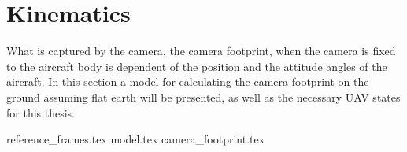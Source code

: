 \chapter{Kinematics}
\label{ch:kinematics}

What is captured by the camera, the camera footprint, when the camera is fixed to the aircraft body is dependent of the position and the attitude angles of the aircraft. In this section a model for calculating the camera footprint on the ground assuming flat earth will be presented, as well as the necessary UAV states for this thesis.

{reference_frames.tex}
{model.tex}
{camera_footprint.tex}
